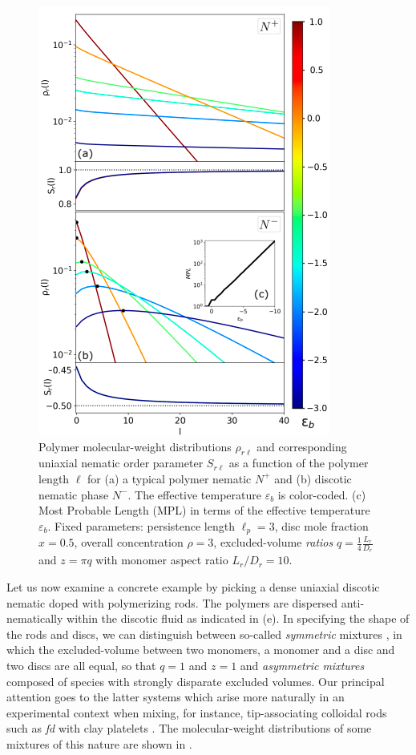\begin{figure}
  \includegraphics[width=0.5 \linewidth]{figures/chapter-2/FIG2}
  \caption[Polymer molecular-weight distributions $\rho_{r \ell}$ and corresponding  uniaxial nematic order parameter $S_{r \ell}$ as a function of the polymer length $\ell$ ]{Polymer molecular-weight distributions $\rho_{r \ell}$ and corresponding  uniaxial nematic order parameter $S_{r \ell}$ as a function of the polymer length $\ell$ for (a) a typical polymer nematic $N^{+}$ and (b) discotic nematic phase $N^{-}$. The effective temperature $\varepsilon_{b}$ is color-coded.
  (c) Most Probable Length (MPL) in terms of the effective temperature $\varepsilon_{b}$. Fixed parameters: persistence length $\ell_{p} = 3$, disc mole fraction $x = 0.5$, overall concentration $\rho = 3$, excluded-volume {\em ratios} $q = \frac{1}{4}\frac{L_{r}}{D_{r}}$ and $z=\pi q$ with monomer aspect ratio $L_{r}/D_{r} =10$.  }
  \label{fig:distributions}
\end{figure}
 
Let us now examine a concrete example by picking a dense uniaxial discotic nematic  doped with polymerizing rods. The polymers are dispersed anti-nematically within the discotic fluid as indicated in (e).   In specifying the shape of the rods and discs, we can distinguish between  so-called {\em symmetric} mixtures \cite{stroobants1984}, in which the excluded-volume  between two monomers, a monomer and a disc and two discs are all equal, so that $q = 1$ and $z = 1$ and {\em asymmetric mixtures} composed of species with  strongly disparate excluded volumes.   Our principal attention goes to the latter systems which arise more naturally in an experimental context when mixing, for instance, tip-associating colloidal rods such as {\em fd} \cite{fraden-tmv-baus,dogic-fraden_fil} with clay platelets \cite{davidson-overview}. The molecular-weight distributions of some mixtures of this nature are shown in .

